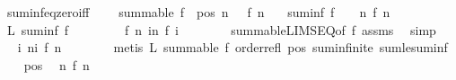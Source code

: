 \begin{isabellebody}
\endisatagproof
{\isafoldproof}%
%
\isadelimproof
\isanewline
%
\endisadelimproof
\isanewline
{}\isamarkupfalse%
\ suminf{\isacharunderscore}{\kern0pt}eq{\isacharunderscore}{\kern0pt}zero{\isacharunderscore}{\kern0pt}iff{\isacharcolon}{\kern0pt}\ \isanewline
\ \ \ {\isachardoublequoteopen}summable\ f{\isachardoublequoteclose}\ \ pos{\isacharcolon}{\kern0pt}\ {\isachardoublequoteopen}{\isasymAnd}n{\isachardot}{\kern0pt}\ {}\ {\isasymle}\ f\ n{\isachardoublequoteclose}\isanewline
\ \ \ {\isachardoublequoteopen}suminf\ f\ {\isacharequal}{\kern0pt}\ {}\ {\isasymlongleftrightarrow}\ {\isacharparenleft}{\kern0pt}{\isasymforall}n{\isachardot}{\kern0pt}\ f\ n\ {\isacharequal}{\kern0pt}\ {}{\isacharparenright}{\kern0pt}{\isachardoublequoteclose}\isanewline
%
\isadelimproof
%
\endisadelimproof
%
\isatagproof
{}\isamarkupfalse%
\isanewline
\ \ \isamarkupfalse%
\ L{\isacharcolon}{\kern0pt}\ {\isachardoublequoteopen}suminf\ f\ {\isacharequal}{\kern0pt}\ {}{\isachardoublequoteclose}\ \isanewline
\ \ \isamarkupfalse%
\ \isamarkupfalse%
\ f{\isacharcolon}{\kern0pt}\ {\isachardoublequoteopen}{\isacharparenleft}{\kern0pt}{\isasymlambda}n{\isachardot}{\kern0pt}\ {\isasymSum}i{\isacharless}{\kern0pt}n{\isachardot}{\kern0pt}\ f\ i{\isacharparenright}{\kern0pt}\ {\isasymlonglonglongrightarrow}\ {}{\isachardoublequoteclose}\isanewline
\ \ \ \ \isamarkupfalse%
\ summable{\isacharunderscore}{\kern0pt}LIMSEQ{\isacharbrackleft}{\kern0pt}of\ f{\isacharbrackright}{\kern0pt}\ assms\ \isamarkupfalse%
\ simp\isanewline
\ \ \isamarkupfalse%
\ \isamarkupfalse%
\ {\isachardoublequoteopen}{\isasymAnd}i{\isachardot}{\kern0pt}\ {\isacharparenleft}{\kern0pt}{\isasymSum}n{\isasymin}{\isacharbraceleft}{\kern0pt}i{\isacharbraceright}{\kern0pt}{\isachardot}{\kern0pt}\ f\ n{\isacharparenright}{\kern0pt}\ {\isasymle}\ {}{\isachardoublequoteclose}\isanewline
\ \ \ \ \isamarkupfalse%
\ {\isacharparenleft}{\kern0pt}metis\ L\ {\isacartoucheopen}summable\ f{\isacartoucheclose}\ order{\isacharunderscore}{\kern0pt}refl\ pos\ sum{\isachardot}{\kern0pt}infinite\ sum{\isacharunderscore}{\kern0pt}le{\isacharunderscore}{\kern0pt}suminf{\isacharparenright}{\kern0pt}\isanewline
\ \ \isamarkupfalse%
\ pos\ \isamarkupfalse%
\ {\isachardoublequoteopen}{\isasymforall}n{\isachardot}{\kern0pt}\ f\ n\ {\isacharequal}{\kern0pt}\ {}{\isachardoublequoteclose}\isanewline

\end{isabellebody}
